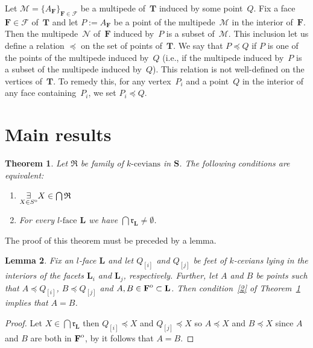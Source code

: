 \documentclass[12pt, reqno]{amsart}
\newtheorem{theorem}{Theorem}[section]
\newtheorem{lemma}[theorem]{Lemma}
\theoremstyle{definition}
\theoremstyle{remark}
\numberwithin{equation}{section}
\newcommand{\interior}[1]{%
  {\kern0pt#1}^{\mathrm{o}}%
}
\begin{document}
{%
Let $\mathcal{M} = \{A_\mathbf{F}\}_{\mathbf{F}\in \mathcal{F}}$ be a multipede of~$\mathbf{T}$ induced by some point~$Q$. Fix a face~$\mathbf{F}\in \mathcal{F}$ of~$\mathbf{T}$ and let $P := A_\mathbf{F}$ be a point of the multipede~$\mathcal{M}$ in the interior of~$\mathbf{F}$. Then the multipede~$\mathcal{N}$ of~$\mathbf{F}$ induced by~$P$ is a subset of~$\mathcal{M}$. This inclusion let us define a relation $\preceq$ on the set of points of~$\mathbf{T}$. We say that $P\preceq Q$ if $P$ is one of the points of the multipede induced by~$Q$ (i.e., if the multipede induced by~$P$ is a subset of the multipede induced by~$Q$). This relation is not well-defined on the vertices of~$\mathbf{T}$. To remedy this, for any vertex~$P_i$ and a point~$Q$ in the interior of any face containing~$P_i$, we set $P_i\preceq Q$.
  
\section{Main results}

\begin{theorem}\label{main}
  Let $\mathfrak{R}$ be family of $k\mbox{-cevians}$ in $\mathbf{S}$.
  The following conditions are equivalent:
  \begin{enumerate}
  \item \label{1} $\underset{X\in\interior{S}}{\exists}X\in\bigcap\mathfrak{R}$ 
  \item \label{2} For every $l\mbox{-face}$ $\mathbf{L}$ we have $\bigcap\mathfrak{r}_\mathbf{L}\neq\emptyset$.
  \end{enumerate}
\end{theorem}

The proof of this theorem must be preceded by a lemma.

\begin{lemma}
Fix an $l$-face $\mathbf{L}$ and let $Q_{[i]}$ and $Q_{[j]}$ be feet of $k$-cevians lying in the interiors of the facets $\mathbf{L}_i$ and $\mathbf{L}_j$, respectively. Further, let $A$ and $B$ be points such that $A\preceq Q_{[i]}$, $B\preceq Q_{[j]}$ and $A,B\in\interior{\mathbf{F}}\subset\mathbf{L}$. Then condition~\eqref{2} of Theorem~\ref{main} implies that $A=B$.
\end{lemma}

\begin{proof}
 Let $X\in\bigcap\mathfrak{r}_\mathbf{L}$ then $Q_{[i]}\preceq X$ and $Q_{[j]}\preceq X$ so $A\preceq X$ and $B\preceq X$ since $A$ and $B$ are both in $\interior{\mathbf{F}}$, by \cite[Proposition~1]{Samet} it follows that $A=B$.
\end{proof}

}
\end{document}
